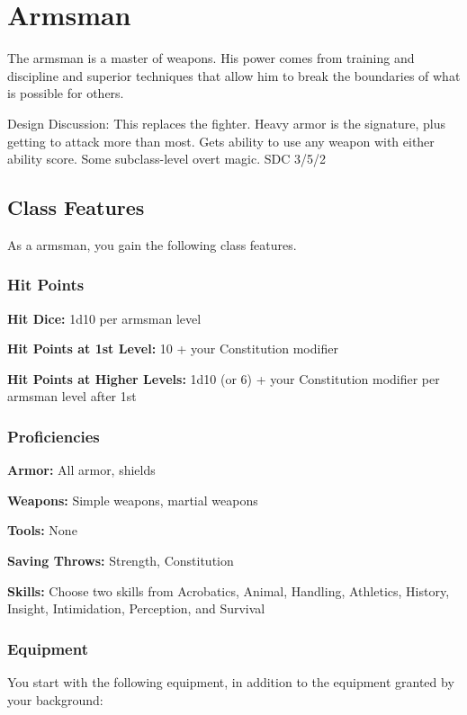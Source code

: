 \section{Armsman}

The armsman is a master of weapons. His power comes from training and discipline and superior techniques that allow him to break the boundaries of what is possible for others.

Design Discussion: This replaces the fighter. Heavy armor is the signature, plus getting to attack more than most. Gets ability to use any weapon with either ability score. Some subclass-level overt magic. SDC 3/5/2

\subsection{Class Features}

As a armsman, you gain the following class features.

\subsubsection{Hit Points}

\textbf{Hit Dice:} 1d10 per armsman level

\textbf{Hit Points at 1st Level:} 10 + your Constitution modifier

\textbf{Hit Points at Higher Levels:} 1d10 (or 6) + your Constitution modifier per armsman level after 1st

\subsubsection{Proficiencies}

\textbf{Armor:} All armor, shields

\textbf{Weapons:} Simple weapons, martial weapons

\textbf{Tools:} None

\textbf{Saving Throws:} Strength, Constitution

\textbf{Skills:} Choose two skills from Acrobatics, Animal, Handling, Athletics, History, Insight, Intimidation, Perception, and Survival

\subsubsection{Equipment}

You start with the following equipment, in addition to the equipment granted by your background:

